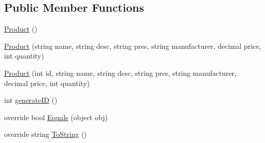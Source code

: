\subsection*{Public Member Functions}
\begin{DoxyCompactItemize}
\item 
\hyperlink{class_health___assignment_1_1_product_ad46b6459ab10e3de613af3966eeafc0a}{Product} ()
\item 
\hyperlink{class_health___assignment_1_1_product_a3ffa7a500f07a018f2cbb6cfd0c1d82b}{Product} (string name, string desc, string pres, string manufacturer, decimal price, int quantity)
\item 
\hyperlink{class_health___assignment_1_1_product_ace1de14f61fa30f37ba9ec2299d29613}{Product} (int id, string name, string desc, string pres, string manufacturer, decimal price, int quantity)
\item 
int \hyperlink{class_health___assignment_1_1_product_aee3dead4e155db8130aa5c2e83ef0e5a}{generate\+ID} ()
\item 
override bool \hyperlink{class_health___assignment_1_1_product_a335c7bd64f6651ac26ace2eb62235cd3}{Equals} (object obj)
\item 
override string \hyperlink{class_health___assignment_1_1_product_ad623b02d976aa7bbe9e4701ce08131e9}{To\+String} ()
\end{DoxyCompactItemize}
